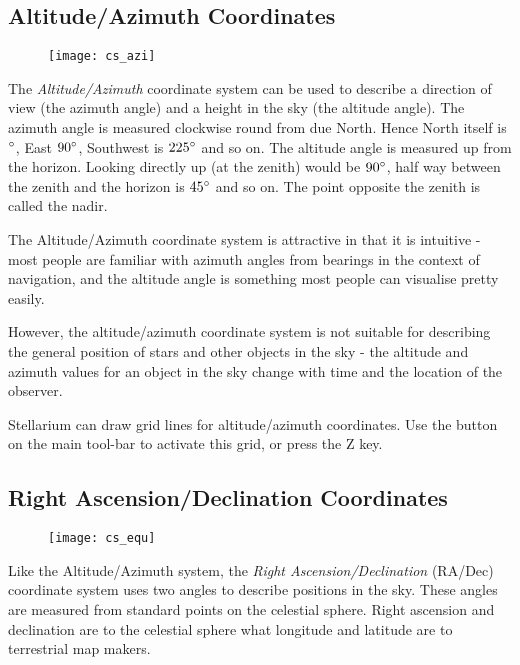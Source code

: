 \subsection{Altitude/Azimuth
Coordinates}\label{altitudeazimuth-coordinates}

\begin{figure}[h]
\centering\texttt{[image: cs\_azi]}
\end{figure}

The \emph{Altitude/Azimuth} coordinate system can be used to describe a
direction of view (the azimuth angle) and a height in the sky (the
altitude angle). The azimuth angle is measured clockwise round from due
North. Hence North itself is $\degree$, East $90\degree$, Southwest is $225\degree$ and so on.
The altitude angle is measured up from the horizon. Looking directly up
(at the zenith) would be $90\degree$, half way between the zenith and the
horizon is $45\degree$ and so on. The point opposite the zenith is called the
nadir.

The Altitude/Azimuth coordinate system is attractive in that it is
intuitive - most people are familiar with azimuth angles from bearings
in the context of navigation, and the altitude angle is something most
people can visualise pretty easily.

However, the altitude/azimuth coordinate system is not suitable for
describing the general position of stars and other objects in the sky -
the altitude and azimuth values for an object in the sky change with
time and the location of the observer.

Stellarium can draw grid lines for altitude/azimuth coordinates. Use the
button on the main tool-bar to activate this grid, or press the Z key.

\subsection{Right Ascension/Declination
Coordinates}\label{right-ascensiondeclination-coordinates}

\begin{figure}[h]
\centering\texttt{[image: cs\_equ]}
\end{figure}

Like the Altitude/Azimuth system, the \emph{Right Ascension/Declination}
(RA/Dec) coordinate system uses two angles to describe positions in the
sky. These angles are measured from standard points on the celestial
sphere. Right ascension and declination are to the celestial sphere what
longitude and latitude are to terrestrial map makers.

